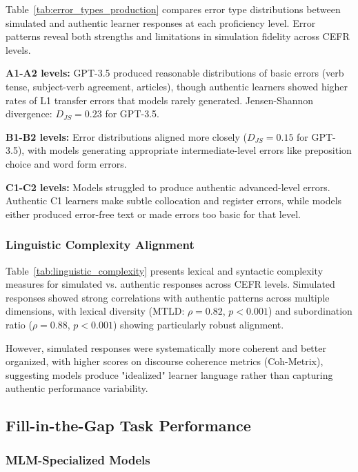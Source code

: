 Table~\ref{tab:error_types_production} compares error type distributions between simulated and authentic learner responses at each proficiency level. Error patterns reveal both strengths and limitations in simulation fidelity across CEFR levels.



\textbf{A1-A2 levels:} GPT-3.5 produced reasonable distributions of basic errors (verb tense, subject-verb agreement, articles), though authentic learners showed higher rates of L1 transfer errors that models rarely generated. Jensen-Shannon divergence: $D_{JS} = 0.23$ for GPT-3.5.

\textbf{B1-B2 levels:} Error distributions aligned more closely ($D_{JS} = 0.15$ for GPT-3.5), with models generating appropriate intermediate-level errors like preposition choice and word form errors.

\textbf{C1-C2 levels:} Models struggled to produce authentic advanced-level errors. Authentic C1 learners make subtle collocation and register errors, while models either produced error-free text or made errors too basic for that level.

\subsubsection{Linguistic Complexity Alignment}

Table~\ref{tab:linguistic_complexity} presents lexical and syntactic complexity measures for simulated vs. authentic responses across CEFR levels. Simulated responses showed strong correlations with authentic patterns across multiple dimensions, with lexical diversity (MTLD: $\rho = 0.82$, $p < 0.001$) and subordination ratio ($\rho = 0.88$, $p < 0.001$) showing particularly robust alignment.



However, simulated responses were systematically more coherent and better organized, with higher scores on discourse coherence metrics (Coh-Metrix), suggesting models produce "idealized" learner language rather than capturing authentic performance variability.

\subsection{Fill-in-the-Gap Task Performance}

\subsubsection{MLM-Specialized Models}

